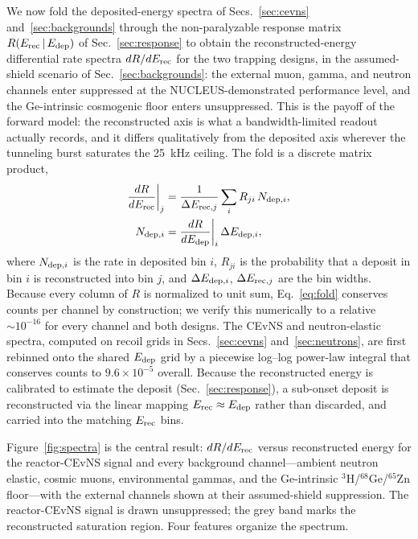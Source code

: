 We now fold the deposited-energy spectra of Secs.~\ref{sec:cevns} and~\ref{sec:backgrounds} through the non-paralyzable response matrix $R(E_{\rm rec}\,|\,E_{\rm dep})$ of Sec.~\ref{sec:response} to obtain the reconstructed-energy differential rate spectra $dR/dE_{\rm rec}$ for the two trapping designs, in the assumed-shield scenario of Sec.~\ref{sec:backgrounds}: the external muon, gamma, and neutron channels enter suppressed at the NUCLEUS-demonstrated performance level, and the Ge-intrinsic cosmogenic floor enters unsuppressed. This is the payoff of the forward model: the reconstructed axis is what a bandwidth-limited readout actually records, and it differs qualitatively from the deposited axis wherever the tunneling burst saturates the 25~kHz ceiling. The fold is a discrete matrix product,
\begin{equation}
\begin{aligned}
\frac{dR}{dE_{\rm rec}}\bigg|_{j} &= \frac{1}{\Delta E_{{\rm rec},j}}\sum_{i} R_{ji}\,N_{{\rm dep},i},\\
N_{{\rm dep},i} &= \frac{dR}{dE_{\rm dep}}\bigg|_{i}\,\Delta E_{{\rm dep},i},
\end{aligned}
\label{eq:fold}
\end{equation}
where $N_{{\rm dep},i}$ is the rate in deposited bin $i$, $R_{ji}$ is the probability that a deposit in bin $i$ is reconstructed into bin $j$, and $\Delta E_{{\rm dep},i}$, $\Delta E_{{\rm rec},j}$ are the bin widths. Because every column of $R$ is normalized to unit sum, Eq.~\eqref{eq:fold} conserves counts per channel by construction; we verify this numerically to a relative $\sim\!10^{-16}$ for every channel and both designs. The CEvNS and neutron-elastic spectra, computed on recoil grids in Secs.~\ref{sec:cevns} and~\ref{sec:neutrons}, are first rebinned onto the shared $E_{\rm dep}$ grid by a piecewise log--log power-law integral that conserves counts to $9.6\times10^{-5}$ overall. Because the reconstructed energy is calibrated to estimate the deposit (Sec.~\ref{sec:response}), a sub-onset deposit is reconstructed via the linear mapping $E_{\rm rec}\approx E_{\rm dep}$ rather than discarded, and carried into the matching $E_{\rm rec}$ bins.

Figure~\ref{fig:spectra} is the central result: $dR/dE_{\rm rec}$ versus reconstructed energy for the reactor-CEvNS signal and every background channel---ambient neutron elastic, cosmic muons, environmental gammas, and the Ge-intrinsic $^{3}$H/$^{68}$Ge/$^{65}$Zn floor---with the external channels shown at their assumed-shield suppression. The reactor-CEvNS signal is drawn unsuppressed; the grey band marks the reconstructed saturation region. Four features organize the spectrum.

